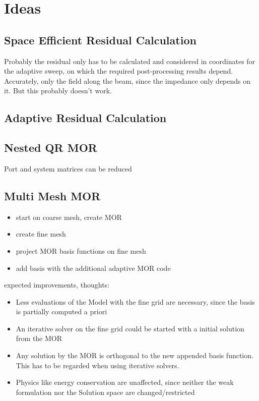 \section{Ideas}

\subsection{Space Efficient Residual Calculation}
Probably the residual only has to be calculated and considered in coordinates for the adaptive sweep, on which the required post-processing results depend. Accurately, only the field along the beam, since the impedance only depends on it. But this probably doesn't work.

\subsection{Adaptive Residual Calculation}

\subsection{Nested QR MOR}
Port and system matrices can be reduced

\subsection{Multi Mesh MOR}
\begin{itemize}
	\item start on coarse mesh, create MOR
	\item create fine mesh
	\item project MOR basis functions on fine mesh
	\item add basis with the additional adaptive MOR code
\end{itemize}

expected improvements, thoughts: 
\begin{itemize}
	\item Less evaluations of the Model with the fine grid are necessary, since the basis is partially computed a priori
	\item An iterative solver on the fine grid could be started with a initial solution from the MOR
	\item Any solution by the MOR is orthogonal to the new appended basis function. This has to be regarded when using iterative solvers.
	\item Physics like energy conservation are unaffected, since neither the weak formulation nor the Solution space are changed/restricted
\end{itemize}